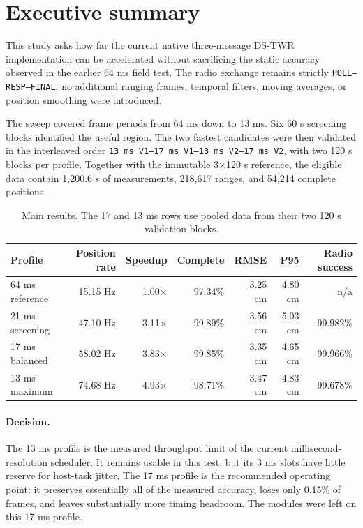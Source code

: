\documentclass[11pt,a4paper]{article}
\newcommand{\dstwr}{DS-TWR}
\begin{document}
\section{Executive summary}

This study asks how far the current native three-message \dstwr{}
implementation can be accelerated without sacrificing the static accuracy
observed in the earlier 64 ms field test. The radio exchange remains strictly
\texttt{POLL--RESP--FINAL}; no additional ranging frames, temporal filters,
moving averages, or position smoothing were introduced.

The sweep covered frame periods from 64 ms down to 13 ms. Six 60 s screening
blocks identified the useful region. The two fastest candidates were then
validated in the interleaved order
\texttt{13 ms V1--17 ms V1--13 ms V2--17 ms V2}, with two 120 s blocks per
profile. Together with the immutable 3$\times$120 s reference, the eligible
data contain 1,200.6 s of measurements, 218,617 ranges, and 54,214 complete
positions.

\begin{table}[H]
  \centering
  \caption{Main results. The 17 and 13 ms rows use pooled data from their two
  120 s validation blocks.}
  \small
  \begin{tabular}{lrrrrrr}
    \toprule
    Profile & Position rate & Speedup & Complete & RMSE & P95 & Radio success\\
    \midrule
    64 ms reference & 15.15 Hz & 1.00$\times$ & 97.34\% & 3.25 cm & 4.80 cm & n/a\\
    21 ms screening & 47.10 Hz & 3.11$\times$ & 99.89\% & 3.56 cm & 5.03 cm & 99.982\%\\
    \textcolor{balancedgreen}{17 ms balanced}
      & 58.02 Hz & 3.83$\times$ & 99.85\% & 3.35 cm & 4.65 cm & 99.966\%\\
    \textcolor{maximumred}{13 ms maximum}
      & 74.68 Hz & 4.93$\times$ & 98.71\% & 3.47 cm & 4.83 cm & 99.678\%\\
    \bottomrule
  \end{tabular}
\end{table}

\paragraph{Decision.}
The 13 ms profile is the measured throughput limit of the current
millisecond-resolution scheduler. It remains usable in this test, but its
3 ms slots have little reserve for host-task jitter. The 17 ms profile is the
recommended operating point: it preserves essentially all of the measured
accuracy, loses only 0.15\% of frames, and leaves substantially more timing
headroom. The modules were left on this 17 ms profile.
\end{document}
